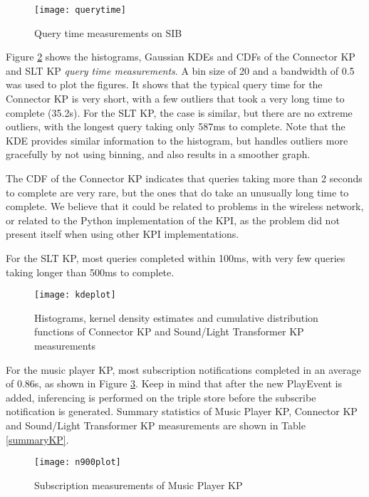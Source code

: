 \begin{figure}
\centerline{
\texttt{[image: querytime]}}
\caption{Query time measurements on SIB}
\label{querytime}
\end{figure}

Figure \ref{kdeplot} shows the histograms, Gaussian \acp{KDE} and \acp{CDF} of the Connector \ac{KP} and \ac{SLT} \ac{KP} \emph{query time measurements}. A bin size of 20 and a bandwidth of 0.5 was used to plot the figures. It shows that the typical query time for the Connector \ac{KP} is very short, with a few outliers that took a very long time to complete (35.2s). For the \ac{SLT} \ac{KP}, the case is similar, but there are no extreme outliers, with the longest query taking only 587ms to complete. Note that the \ac{KDE} provides similar information to the histogram, but handles outliers more gracefully by not using binning, and also results in a smoother graph.

The \ac{CDF} of the Connector \ac{KP} indicates that queries taking more than 2 seconds to complete are very rare, but the ones that do take an unusually long time to complete. We believe that it could be related to problems in the wireless network, or related to the Python implementation of the \ac{KPI}, as the problem did not present itself when using other \ac{KPI} implementations.

For the \ac{SLT} \ac{KP}, most queries completed within 100ms, with very few queries taking longer than 500ms to complete.

\begin{figure}
\centerline{
\texttt{[image: kdeplot]}}
\caption{Histograms, kernel density estimates and cumulative distribution functions of Connector KP and Sound/Light Transformer KP measurements}
\label{kdeplot}
\end{figure}

For the music player \ac{KP}, most subscription notifications completed in an average of 0.86s, as shown in Figure \ref{n900plot}. Keep in mind that after the new PlayEvent is added, inferencing is performed on the triple store before the subscribe notification is generated. Summary statistics of Music Player \ac{KP}, Connector \ac{KP} and Sound/Light Transformer \ac{KP} measurements are shown in Table \ref{summaryKP}.

\begin{figure}
\centerline{
\texttt{[image: n900plot]}}
\caption{Subscription measurements of Music Player KP}
\label{n900plot}
\end{figure}


